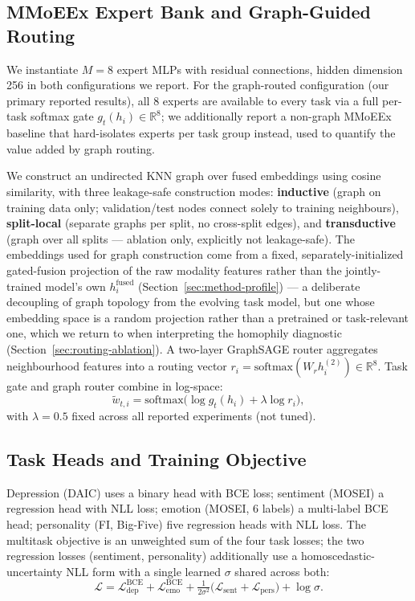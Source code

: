\documentclass[letterpaper]{article}
\begin{document}
\subsection{MMoEEx Expert Bank and Graph-Guided Routing}

We instantiate $M{=}8$ expert MLPs with residual connections, hidden dimension 256 in both configurations we report. For the graph-routed configuration (our primary reported results), all 8 experts are available to every task via a full per-task softmax gate $g_t(h_i) \in \mathbb{R}^8$; we additionally report a non-graph MMoEEx baseline that hard-isolates experts per task group instead, used to quantify the value added by graph routing.

We construct an undirected KNN graph over fused embeddings using cosine similarity, with three leakage-safe construction modes: \textbf{inductive} (graph on training data only; validation/test nodes connect solely to training neighbours), \textbf{split-local} (separate graphs per split, no cross-split edges), and \textbf{transductive} (graph over all splits — ablation only, explicitly not leakage-safe). The embeddings used for graph construction come from a fixed, separately-initialized gated-fusion projection of the raw modality features rather than the jointly-trained model's own $h_i^{\text{fused}}$ (Section~\ref{sec:method-profile}) — a deliberate decoupling of graph topology from the evolving task model, but one whose embedding space is a random projection rather than a pretrained or task-relevant one, which we return to when interpreting the homophily diagnostic (Section~\ref{sec:routing-ablation}). A two-layer GraphSAGE router aggregates neighbourhood features into a routing vector $r_i = \text{softmax}(W_r h_i^{(2)}) \in \mathbb{R}^8$. Task gate and graph router combine in log-space:
\[
    \tilde w_{t,i} = \text{softmax}\big(\log g_t(h_i) + \lambda \log r_i\big),
\]
with $\lambda{=}0.5$ fixed across all reported experiments (not tuned).

\subsection{Task Heads and Training Objective}

Depression (DAIC) uses a binary head with BCE loss; sentiment (MOSEI) a regression head with NLL loss; emotion (MOSEI, 6 labels) a multi-label BCE head; personality (FI, Big-Five) five regression heads with NLL loss. The multitask objective is an unweighted sum of the four task losses; the two regression losses (sentiment, personality) additionally use a homoscedastic-uncertainty NLL form \citep{kendall2017uncertainties} with a single learned $\sigma$ shared across both:
\[
    \mathcal{L} = \mathcal{L}_{\text{dep}}^{\text{BCE}} + \mathcal{L}_{\text{emo}}^{\text{BCE}} + \tfrac{1}{2\sigma^2}\big(\mathcal{L}_{\text{sent}} + \mathcal{L}_{\text{pers}}\big) + \log\sigma.
\]
\end{document}
